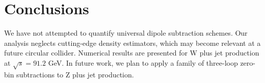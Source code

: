 \section{Conclusions}\label{sec:conclusions}

We have not attempted to quantify universal dipole subtraction schemes.
Our analysis neglects cutting-edge density estimators, which may become
relevant at a future circular collider. Numerical results are presented
for W plus jet production at $\sqrt{s} = 91.2$ GeV. In future work, we
plan to apply a family of three-loop zero-bin subtractions to Z plus jet
production.

